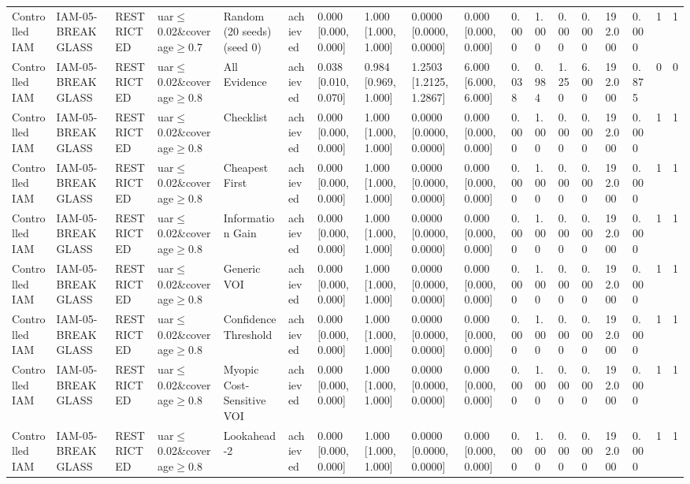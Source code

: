 \begin{table}[!ht]
{\begin{tabular}{llllllllllllllllll}
Controlled IAM & IAM-05-BREAKGLASS & RESTRICTED & uar$\le$0.02\&coverage$\ge$0.7 & Random (20 seeds) (seed 0) & achieved & 0.000 [0.000, 0.000] & 1.000 [1.000, 1.000] & 0.0000 [0.0000, 0.0000] & 0.000 [0.000, 0.000] & 0.000 & 1.000 & 0.000 & 0.000 & 192.000 & 0.000 & 1 & 1 \\
Controlled IAM & IAM-05-BREAKGLASS & RESTRICTED & uar$\le$0.02\&coverage$\ge$0.8 & All Evidence & achieved & 0.038 [0.010, 0.070] & 0.984 [0.969, 1.000] & 1.2503 [1.2125, 1.2867] & 6.000 [6.000, 6.000] & 0.038 & 0.984 & 1.250 & 6.000 & 192.000 & 0.875 & 0 & 0 \\
Controlled IAM & IAM-05-BREAKGLASS & RESTRICTED & uar$\le$0.02\&coverage$\ge$0.8 & Checklist & achieved & 0.000 [0.000, 0.000] & 1.000 [1.000, 1.000] & 0.0000 [0.0000, 0.0000] & 0.000 [0.000, 0.000] & 0.000 & 1.000 & 0.000 & 0.000 & 192.000 & 0.000 & 1 & 1 \\
Controlled IAM & IAM-05-BREAKGLASS & RESTRICTED & uar$\le$0.02\&coverage$\ge$0.8 & Cheapest First & achieved & 0.000 [0.000, 0.000] & 1.000 [1.000, 1.000] & 0.0000 [0.0000, 0.0000] & 0.000 [0.000, 0.000] & 0.000 & 1.000 & 0.000 & 0.000 & 192.000 & 0.000 & 1 & 1 \\
Controlled IAM & IAM-05-BREAKGLASS & RESTRICTED & uar$\le$0.02\&coverage$\ge$0.8 & Information Gain & achieved & 0.000 [0.000, 0.000] & 1.000 [1.000, 1.000] & 0.0000 [0.0000, 0.0000] & 0.000 [0.000, 0.000] & 0.000 & 1.000 & 0.000 & 0.000 & 192.000 & 0.000 & 1 & 1 \\
Controlled IAM & IAM-05-BREAKGLASS & RESTRICTED & uar$\le$0.02\&coverage$\ge$0.8 & Generic VOI & achieved & 0.000 [0.000, 0.000] & 1.000 [1.000, 1.000] & 0.0000 [0.0000, 0.0000] & 0.000 [0.000, 0.000] & 0.000 & 1.000 & 0.000 & 0.000 & 192.000 & 0.000 & 1 & 1 \\
Controlled IAM & IAM-05-BREAKGLASS & RESTRICTED & uar$\le$0.02\&coverage$\ge$0.8 & Confidence Threshold & achieved & 0.000 [0.000, 0.000] & 1.000 [1.000, 1.000] & 0.0000 [0.0000, 0.0000] & 0.000 [0.000, 0.000] & 0.000 & 1.000 & 0.000 & 0.000 & 192.000 & 0.000 & 1 & 1 \\
Controlled IAM & IAM-05-BREAKGLASS & RESTRICTED & uar$\le$0.02\&coverage$\ge$0.8 & Myopic Cost-Sensitive VOI & achieved & 0.000 [0.000, 0.000] & 1.000 [1.000, 1.000] & 0.0000 [0.0000, 0.0000] & 0.000 [0.000, 0.000] & 0.000 & 1.000 & 0.000 & 0.000 & 192.000 & 0.000 & 1 & 1 \\
Controlled IAM & IAM-05-BREAKGLASS & RESTRICTED & uar$\le$0.02\&coverage$\ge$0.8 & Lookahead-2 & achieved & 0.000 [0.000, 0.000] & 1.000 [1.000, 1.000] & 0.0000 [0.0000, 0.0000] & 0.000 [0.000, 0.000] & 0.000 & 1.000 & 0.000 & 0.000 & 192.000 & 0.000 & 1 & 1 \\

\end{tabular}}
\end{table}
